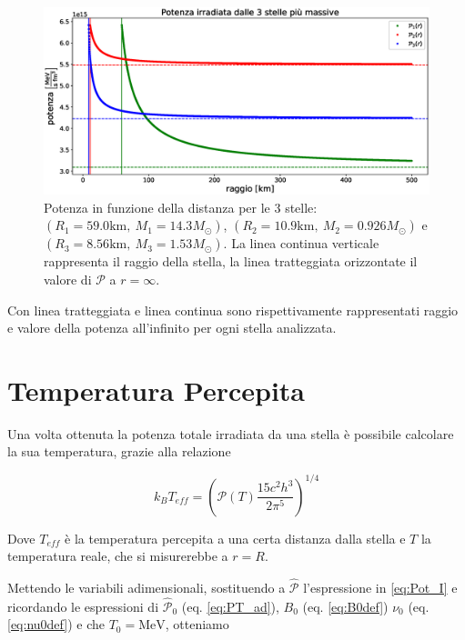 \documentclass[a4paper, titlepage]{article}
\begin{document}
\begin{figure}[h]
    \centering
    \includegraphics[width = \textwidth]{Figures/Pot.eps}
    \caption{Potenza in funzione della distanza per le 3 stelle: $(R_1 = 59.0 \unit{\kilo\meter},~M_1 = 14.3 M_\odot)$, $(R_2 = 10.9 \unit{\kilo\meter},~M_2 = 0.926 M_\odot)$ e $(R_3 = 8.56 \unit{\kilo\meter},~M_3 = 1.53 M_\odot)$.
    La linea continua verticale rappresenta il raggio della stella, la linea tratteggiata orizzontate il valore di $\mathcal{P}$ a $r = \infty$.}
    \label{fig:Pot}
\end{figure}

Con linea tratteggiata e linea continua sono rispettivamente rappresentati raggio e valore della potenza all'infinito per ogni stella analizzata.



\newpage
\section{Temperatura Percepita}

Una volta ottenuta la potenza totale irradiata da una stella è possibile calcolare la sua temperatura, grazie alla relazione

\begin{equation}
    k_B T_{eff} = \left( \mathcal{P} (T) \frac{15 c^2 h^3}{2 \pi^5} \right)^{1/4}
    \label{eq:Teff}
\end{equation}

Dove $T_{eff}$ è la temperatura percepita a una certa distanza dalla stella e $T$ la temperatura reale, che si misurerebbe a $r = R$.

Mettendo le variabili adimensionali, sostituendo a $\mathcal{\hat P}$ l'espressione in \ref{eq:Pot_I} e ricordando le espressioni di $\mathcal{\hat P}_0$ (eq. \ref{eq:PT_ad}), $B_0$ (eq. \ref{eq:B0def}) $\nu_0$ (eq. \ref{eq:nu0def}) e che $T_0 = \unit{\mega\electronvolt}$, otteniamo
\end{document}
